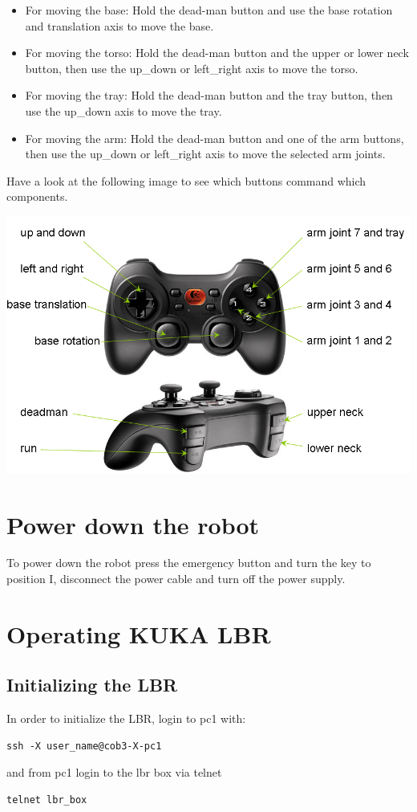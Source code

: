 \begin{itemize}
\item For moving the base: Hold the dead-man button and use the base rotation and translation axis to move the base.
\item For moving the torso: Hold the dead-man button and the upper or lower neck button, then use the up\_down or left\_right axis to move the torso.
\item For moving the tray: Hold the dead-man button and the tray button, then use the up\_down axis to move the tray.
\item For moving the arm: Hold the dead-man button and one of the arm buttons, then use the up\_down or left\_right axis to move the selected arm joints.
\end{itemize}

Have a look at the following image to see which buttons command which components. 
\begin{center}
\includegraphics[width=1\textwidth]{images/joystick.png}
\end{center}

\section{Power down the robot}
To power down the robot press the emergency button and turn the key to position I, disconnect the power cable and turn off the power supply.

\section{Operating KUKA LBR} \label{LBR}
\subsection{Initializing the LBR}\label{lbr_init}
In order to initialize the LBR, login to pc1 with:
\begin{lstlisting}
ssh -X user_name@cob3-X-pc1
\end{lstlisting}
and from pc1 login to the lbr box via telnet
\begin{lstlisting}
telnet lbr_box
\end{lstlisting}

